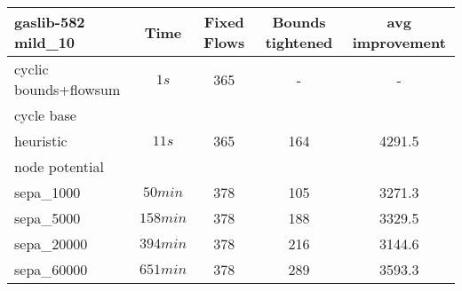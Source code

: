 \begin{center}
\begin{tabular}{ l | c | c | c | c }

\textbf{gaslib-582 mild\_10} & Time  & Fixed Flows & Bounds tightened & avg improvement\\
\hline
 cyclic bounds+flowsum& $1s$ & 365 & - & -\\
 cycle base& $ $ &  &  & \\
 heuristic& $11s $&365 & 164 & 4291.5\\
 node potential& $ $ &  &   &  \\ 
 sepa\_1000& $50 min $ & 378 & 105 & 3271.3 \\
 sepa\_5000& $ 158 min $ & 378 & 188 & 3329.5 \\
 sepa\_20000& $ 394 min$ & 378 & 216 &3144.6 \\
 sepa\_60000& $651 min $ & 378& 289&3593.3 \\
\end{tabular} 
\end{center}


